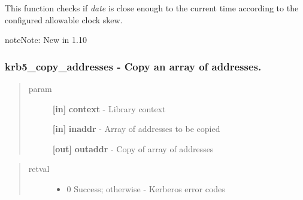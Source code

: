 \documentclass[letterpaper,10pt,english]{sphinxmanual}
\begin{document}
This function checks if \emph{date} is close enough to the current time according to the configured allowable clock skew.

\begin{notice}{note}{Note:}
New in 1.10
\end{notice}


\subsubsection{krb5\_copy\_addresses -  Copy an array of addresses.}
\label{appdev/refs/api/krb5_copy_addresses:krb5-copy-addresses-copy-an-array-of-addresses}\label{appdev/refs/api/krb5_copy_addresses::doc}

\begin{fulllineitems}
\label{appdev/refs/api/krb5_copy_addresses:krb5_copy_addresses}
\end{fulllineitems}

\begin{quote}\begin{description}
\item[{param}] \leavevmode
\textbf{{[}in{]}} \textbf{context} - Library context

\textbf{{[}in{]}} \textbf{inaddr} - Array of addresses to be copied

\textbf{{[}out{]}} \textbf{outaddr} - Copy of array of addresses

\end{description}\end{quote}
\begin{quote}\begin{description}
\item[{retval}] \leavevmode\begin{itemize}
\item {} 
0   Success; otherwise - Kerberos error codes

\end{itemize}

\end{description}\end{quote}
\end{document}
